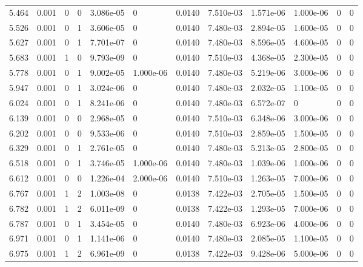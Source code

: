 \documentclass[preview]{standalone}
\begin{document}
{{{\begin{tabular}{L{1.2cm}C{1.2cm} C{0.3cm}C{0.5cm} C{1.4cm}C{1.4cm} C{1.4cm}C{1.4cm} C{1.6cm}C{1.6cm} C{1.6cm}C{1.6cm}}
  5.464  &  0.001  & 0     &  0 &  3.086e-05  & 0  &  0.0140&   7.510e-03& 1.571e-06 & 1.000e-06   &  0 & 0  \\ 
  5.526  &  0.001  & 0     &  1 &  3.606e-05  & 0  &  0.0140&   7.480e-03& 2.894e-05 & 1.600e-05   &  0 & 0  \\ 
  5.627  &  0.001  & 0     &  1 &  7.701e-07  & 0  &  0.0140&   7.480e-03& 8.596e-05 & 4.600e-05   &  0 & 0  \\ 
  5.683  &  0.001  & 1     &  0 &  9.793e-09  & 0  &  0.0140&   7.510e-03& 4.368e-05 & 2.300e-05   &  0 & 0  \\ 
  5.778  &  0.001  & 0     &  1 &  9.002e-05  & 1.000e-06  &  0.0140&   7.480e-03& 5.219e-06 & 3.000e-06   &  0 & 0  \\ 
  5.947  &  0.001  & 0     &  1 &  3.024e-06  & 0  &  0.0140&   7.480e-03& 2.032e-05 & 1.100e-05   &  0 & 0  \\ 
  6.024  &  0.001  & 0     &  1 &  8.241e-06  & 0  &  0.0140&   7.480e-03& 6.572e-07 & 0   &  0 & 0  \\ 
  6.139  &  0.001  & 0     &  0 &  2.968e-05  & 0  &  0.0140&   7.510e-03& 6.348e-06 & 3.000e-06   &  0 & 0  \\ 
  6.202  &  0.001  & 0     &  0 &  9.533e-06  & 0  &  0.0140&   7.510e-03& 2.859e-05 & 1.500e-05   &  0 & 0  \\ 
  6.329  &  0.001  & 0     &  1 &  2.761e-05  & 0  &  0.0140&   7.480e-03& 5.213e-05 & 2.800e-05   &  0 & 0  \\ 
  6.518  &  0.001  & 0     &  1 &  3.746e-05  & 1.000e-06  &  0.0140&   7.480e-03& 1.039e-06 & 1.000e-06   &  0 & 0  \\ 
  6.612  &  0.001  & 0     &  0 &  1.226e-04  & 2.000e-06  &  0.0140&   7.510e-03& 1.263e-05 & 7.000e-06   &  0 & 0  \\ 
  6.767  &  0.001  & 1     &  2 &  1.003e-08  & 0  &  0.0138&   7.422e-03& 2.705e-05 & 1.500e-05   &  0 & 0  \\ 
  6.782  &  0.001  & 1     &  2 &  6.011e-09  & 0  &  0.0138&   7.422e-03& 1.293e-05 & 7.000e-06   &  0 & 0  \\ 
  6.787  &  0.001  & 0     &  1 &  3.454e-05  & 0  &  0.0140&   7.480e-03& 6.923e-06 & 4.000e-06   &  0 & 0  \\ 
  6.971  &  0.001  & 0     &  1 &  1.141e-06  & 0  &  0.0140&   7.480e-03& 2.085e-05 & 1.100e-05   &  0 & 0  \\ 
  6.975  &  0.001  & 1     &  2 &  6.961e-09  & 0  &  0.0138&   7.422e-03& 9.428e-06 & 5.000e-06   &  0 & 0  \\ 

\end{tabular}}}}
\end{document}
